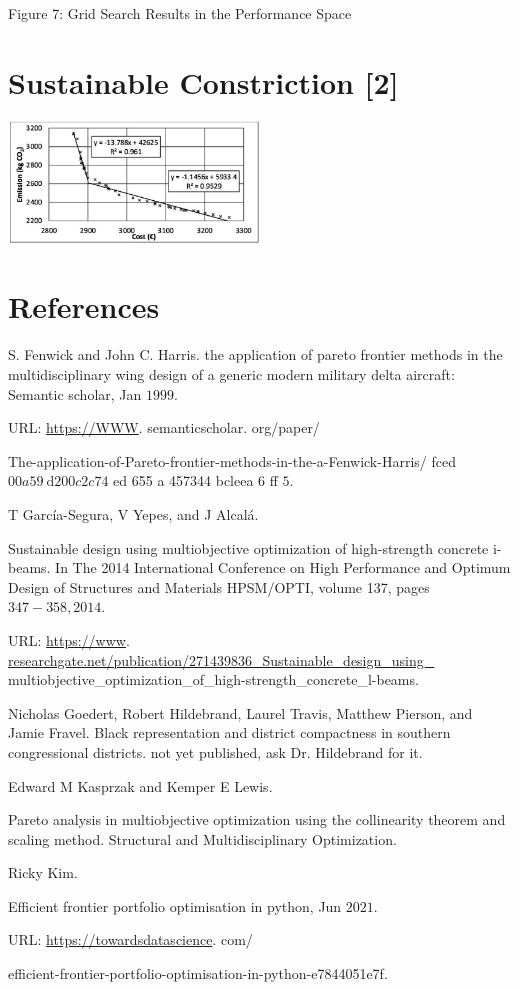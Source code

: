 Figure 7: Grid Search Results in the Performance Space

\section{Sustainable Constriction [2]}
\includegraphics[width=0.5\textwidth]{optimization/multi-objective/images/2022_02_28_634e8079070800ac7e3cg-23}

\section{References}
S. Fenwick and John C. Harris. the application of pareto frontier methods in the multidisciplinary wing design of a generic modern military delta aircraft: Semantic scholar, Jan $1999 .$

URL: \href{https://WWW}{https://WWW}. semanticscholar. org/paper/

The-application-of-Pareto-frontier-methods-in-the-a-Fenwick-Harris/ fced $00 a 59 \mathrm{~d} 200 c 2 c 74$ ed 655 a 457344 bcleea 6 ff $5 .$

T García-Segura, V Yepes, and J Alcalá.

Sustainable design using multiobjective optimization of high-strength concrete i-beams. In The 2014 International Conference on High Performance and Optimum Design of Structures and Materials HPSM/OPTI, volume 137, pages $347-358,2014 .$

URL: \href{https://www}{https://www}. \href{http://researchgate.net/publication/271439836_Sustainable_design_using_}{researchgate.net/publication/271439836\_Sustainable\_design\_using\_} multiobjective\_optimization\_of\_high-strength\_concrete\_l-beams.

Nicholas Goedert, Robert Hildebrand, Laurel Travis, Matthew Pierson, and Jamie Fravel. Black representation and district compactness in southern congressional districts. not yet published, ask Dr. Hildebrand for it.

Edward M Kasprzak and Kemper E Lewis.

Pareto analysis in multiobjective optimization using the collinearity theorem and scaling method. Structural and Multidisciplinary Optimization.

Ricky Kim.

Efficient frontier portfolio optimisation in python, Jun $2021 .$

URL: \href{https://towardsdatascience}{https://towardsdatascience}. com/

efficient-frontier-portfolio-optimisation-in-python-e7844051e7f.


%